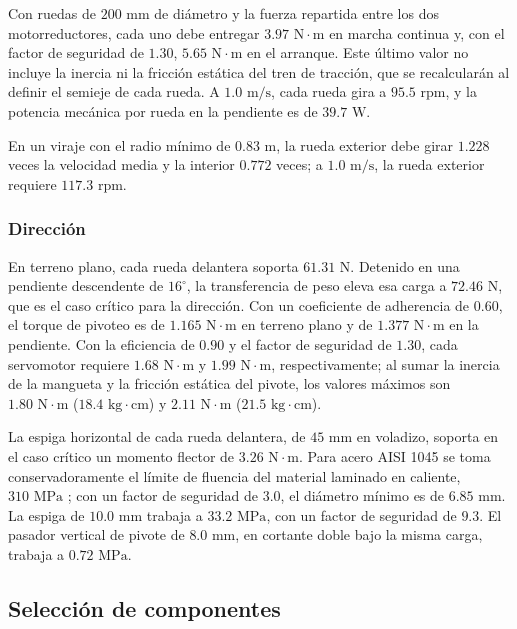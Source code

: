 \documentclass[../../General.tex]{subfiles}
\begin{document}
Con ruedas de $200\text{ mm}$ de diámetro y la fuerza repartida entre los dos motorreductores, cada uno debe entregar $3.97\text{ N}\cdot\text{m}$ en marcha continua y, con el factor de seguridad de $1.30$, $5.65\text{ N}\cdot\text{m}$ en el arranque. Este último valor no incluye la inercia ni la fricción estática del tren de tracción, que se recalcularán al definir el semieje de cada rueda. A $1.0\text{ m/s}$, cada rueda gira a $95.5\text{ rpm}$, y la potencia mecánica por rueda en la pendiente es de $39.7\text{ W}$.

En un viraje con el radio mínimo de $0.83\text{ m}$, la rueda exterior debe girar $1.228$ veces la velocidad media y la interior $0.772$ veces; a $1.0\text{ m/s}$, la rueda exterior requiere $117.3\text{ rpm}$.

\subsubsection{Dirección}

En terreno plano, cada rueda delantera soporta $61.31\text{ N}$. Detenido en una pendiente descendente de $16^\circ$, la transferencia de peso eleva esa carga a $72.46\text{ N}$, que es el caso crítico para la dirección. Con un coeficiente de adherencia de $0.60$, el torque de pivoteo es de $1.165\text{ N}\cdot\text{m}$ en terreno plano y de $1.377\text{ N}\cdot\text{m}$ en la pendiente. Con la eficiencia de $0.90$ y el factor de seguridad de $1.30$, cada servomotor requiere $1.68\text{ N}\cdot\text{m}$ y $1.99\text{ N}\cdot\text{m}$, respectivamente; al sumar la inercia de la mangueta y la fricción estática del pivote, los valores máximos son $1.80\text{ N}\cdot\text{m}$ ($18.4\text{ kg}\cdot\text{cm}$) y $2.11\text{ N}\cdot\text{m}$ ($21.5\text{ kg}\cdot\text{cm}$).

La espiga horizontal de cada rueda delantera, de $45\text{ mm}$ en voladizo, soporta en el caso crítico un momento flector de $3.26\text{ N}\cdot\text{m}$. Para acero AISI 1045 se toma conservadoramente el límite de fluencia del material laminado en caliente, $310\text{ MPa}$ \citep{Shigley11th}; con un factor de seguridad de $3.0$, el diámetro mínimo es de $6.85\text{ mm}$. La espiga de $10.0\text{ mm}$ trabaja a $33.2\text{ MPa}$, con un factor de seguridad de $9.3$. El pasador vertical de pivote de $8.0\text{ mm}$, en cortante doble bajo la misma carga, trabaja a $0.72\text{ MPa}$.

\subsection{Selección de componentes}
\end{document}
